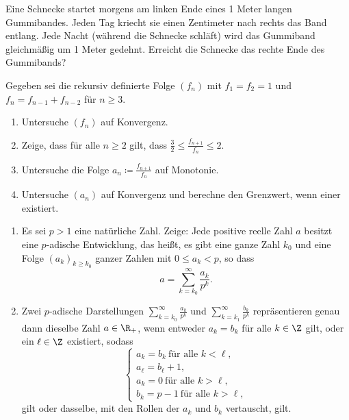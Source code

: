 \begin{prob}
  Eine Schnecke startet morgens am linken Ende eines 1 Meter langen Gummibandes.
  Jeden Tag kriecht sie einen Zentimeter nach rechts das Band entlang. Jede
  Nacht (während die Schnecke schläft) wird das Gummiband gleichmäßig um 1 Meter
  gedehnt. Erreicht die Schnecke das rechte Ende des Gummibands?
\end{prob}

\begin{prob}
  Gegeben sei die rekursiv definierte Folge $(f_n)$ mit $f_1 = f_2 = 1$ und
  $f_n = f_{n-1} + f_{n-2}$ für $n \geq 3$.
  \begin{enumerate}[label=(\alph*)]
  \item Untersuche $(f_n)$ auf Konvergenz.
  \item Zeige, dass für alle $n \geq 2$ gilt, dass
    $\frac{3}{2} \leq \frac{f_{n+1}}{f_n} \leq 2$.
  \item Untersuche die Folge $a_n \coloneqq \frac{f_{n+1}}{f_n}$ auf Monotonie.
  \item Untersuche $(a_n)$ auf Konvergenz und berechne den Grenzwert, wenn einer
    existiert.
  \end{enumerate}
\end{prob}

\begin{prob}
  \begin{enumerate}[label=(\alph*)]
  \item Es sei $p > 1$ eine natürliche Zahl. Zeige: Jede positive reelle Zahl $a$
    besitzt eine $p$-adische Entwicklung, das heißt, es gibt eine ganze Zahl
    $k_0$ und eine Folge $(a_k)_{k \geq k_0}$ ganzer Zahlen mit $0 \leq a_k < p$,
    so dass
    \begin{equation*}
      a = \sum_{k=k_0}^{\infty}\frac{a_k}{p^k}.
    \end{equation*}
  \item Zwei $p$-adische Darstellungen
    $\displaystyle\sum_{k=k_0}^{\infty} \frac{a_k}{p^k}$ und
    $\displaystyle\sum_{k=k_1}^{\infty} \frac{b_k}{p^k}$ repräsentieren genau dann
    dieselbe Zahl $a \in \R_+$, wenn entweder $a_k = b_k$ für alle $k \in \Z$
    gilt, oder ein $\ell \in \Z$ existiert, sodass
    \begin{equation*}
      \begin{cases}
        a_k = b_k\ \text{für alle } k < \ell, \\
        a_\ell = b_\ell + 1,                  \\
        a_k = 0\ \text{für alle } k > \ell,   \\
        b_k = p-1\ \text{für alle } k > \ell,
      \end{cases}
    \end{equation*}
    gilt oder dasselbe,  mit den Rollen der $a_k$ und $b_k$ vertauscht, gilt.
  \end{enumerate}
\end{prob}
